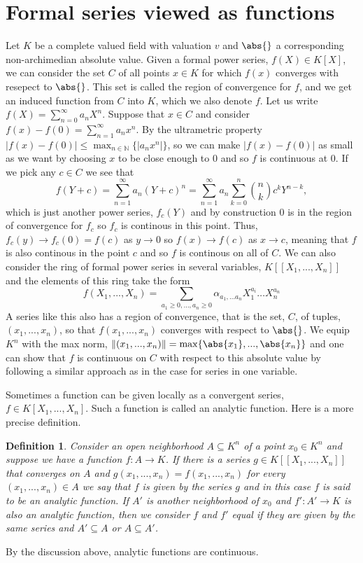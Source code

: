 \documentclass{article}
\newtheorem{definition}{Definition}[section]
\newcommand{\mbb}[1]{\mathbb{#1}}
\numberwithin{equation}{section}
\begin{document}
\section{Formal series viewed as functions}
Let $K$ be a complete valued field with valuation $v$ and $\abs{}$ a corresponding non-archimedian absolute value. Given a formal power series, $f(X) \in K[X]$, we can consider the set $C$ of all points $x \in K$ for which $f(x)$ converges with resepect to $\abs{}$. This set is called the region of convergence for $f$, and we get an induced function from $C$ into $K$, which we also denote $f$. Let us write $f(X) = \sum_{n=0}^\infty a_n X^n$. Suppose that $x \in C$ and consider $f(x) - f(0) = \sum_{n=1}^\infty a_n x^n$. By the ultrametric property $|f(x) - f(0)| \leq \max_{n \in \mbb N} \{ |a_n x^n| \}$, so we can make $|f(x) - f(0)|$ as small as we want by choosing $x$ to be close enough to 0 and so $f$ is continuous at 0. If we pick any $c \in C$ we see that 
$$f(Y + c) = \sum_{n=1}^\infty a_n (Y + c)^n = \sum_{n=1}^\infty a_n \sum_{k = 0}^n \binom{n}{k} c^{k}Y^{n-k},$$
which is just another power series, $f_c(Y)$ and by construction $0$ is in the region of convergence for $f_c$ so $f_c$ is continous in this point. Thus, $f_c(y) \to f_c(0) = f(c)$ as $y \to 0$ so $f(x) \to f(c)$ as $x \to c$, meaning that $f$ is also continous in the point $c$ and so $f$ is continous on all of $C$. We can also consider the ring of formal power series in several variables, $K[[X_1, ..., X_n]]$ and the elements of this ring take the form
$$f(X_1, ..., X_n) = \sum_{a_1 \geq 0, \ldots, a_n \geq 0} \alpha_{a_1, \ldots a_n} X_1^{a_i} \ldots X_n^{a_n}$$
A series like this also has a region of convergence, that is the set, $C$, of tuples, $(x_1, ..., x_n)$, so that $f(x_1, ..., x_n)$ converges with respect to $\abs{}$. We equip $K^n$ with the max norm, $\|(x_1, ..., x_n)\| = \max \{\abs{x_1}, ..., \abs{x_n} \}$ and one can show that $f$ is continuous on $C$ with respect to this absolute value by following a similar approach as in the case for series in one variable. 

Sometimes a function can be given locally as a convergent series, $f \in K[X_1, ..., X_n]$. Such a function is called an analytic function. Here is a more precise definition.
\begin{definition}
   Consider an open neighborhood $A \subseteq K^n$ of a point $x_0 \in K^n$ and suppose we have a function $f : A \to K$. If there is a series $g \in K[[X_1, ..., X_n]]$ that converges on $A$ and $g(x_1, ..., x_n) = f(x_1, ..., x_n)$ for every $(x_1, ..., x_n) \in A$ we say that $f$ is given by the series $g$ and in this case $f$ is said to be an analytic function. If $A'$ is another neighborhood of $x_0$ and $f' : A' \to K$ is also an analytic function, then we consider $f$ and $f'$ equal if they are given by the same series and $A' \subseteq A$ or $A \subseteq A'$. 
\end{definition}
By the discussion above, analytic functions are continuous.
\end{document}
